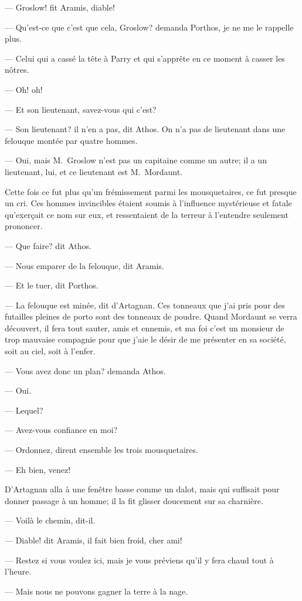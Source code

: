 — Groslow! fit Aramis, diable!

— Qu'est-ce que c'est que cela, Groslow? demanda Porthos, je ne me le rappelle plus.

— Celui qui a cassé la tête à Parry et qui s'apprête en ce moment à casser les nôtres.

— Oh! oh!

— Et son lieutenant, savez-vous qui c'est?

— Son lieutenant? il n'en a pas, dit Athos. On n'a pas de lieutenant dans une felouque montée par quatre hommes.

— Oui, mais M.~Groslow n'est pas un capitaine comme un autre; il a un lieutenant, lui, et ce lieutenant est M.~Mordaunt.

Cette fois ce fut plus qu'un frémissement parmi les mousquetaires, ce fut presque un cri. Ces hommes invincibles étaient soumis à l'influence mystérieuse et fatale qu'exerçait ce nom sur eux, et ressentaient de la terreur à l'entendre seulement prononcer.

— Que faire? dit Athos.

— Nous emparer de la felouque, dit Aramis.

— Et le tuer, dit Porthos.

— La felouque est minée, dit d'Artagnan. Ces tonneaux que j'ai pris pour des futailles pleines de porto sont des tonneaux de poudre. Quand Mordaunt se verra découvert, il fera tout sauter, amis et ennemis, et ma foi c'est un monsieur de trop mauvaise compagnie pour que j'aie le désir de me présenter en sa société, soit au ciel, soit à l'enfer.

— Vous avez donc un plan? demanda Athos.

— Oui.

— Lequel?

— Avez-vous confiance en moi?

— Ordonnez, dirent ensemble les trois mousquetaires.

— Eh bien, venez!

D'Artagnan alla à une fenêtre basse comme un dalot, mais qui suffisait pour donner passage à un homme; il la fit glisser doucement sur sa charnière.

— Voilà le chemin, dit-il.

— Diable! dit Aramis, il fait bien froid, cher ami!

— Restez si vous voulez ici, mais je vous préviens qu'il y fera chaud tout à l'heure.

— Mais nous ne pouvons gagner la terre à la nage.

